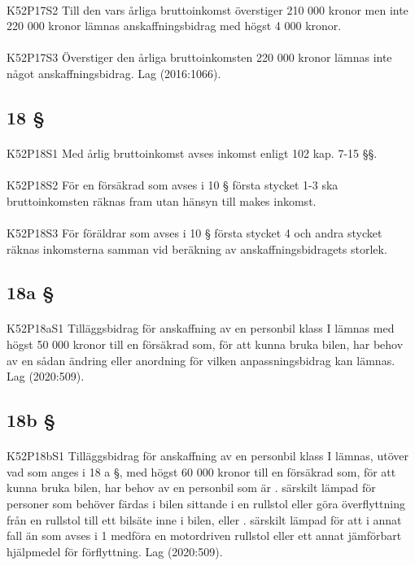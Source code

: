 \documentclass[a4paper,notitlepage,openany,10pt]{book}
\begin{document}
\paragraph*{}
{\tiny K52P17S2}
Till den vars årliga bruttoinkomst överstiger 210 000 kronor men inte 220 000 kronor lämnas anskaffningsbidrag med högst 4 000 kronor.
\paragraph*{}
{\tiny K52P17S3}
Överstiger den årliga bruttoinkomsten 220 000 kronor lämnas inte något anskaffningsbidrag.
Lag (2016:1066).
\subsection*{18 §}
\paragraph*{}
{\tiny K52P18S1}
Med årlig bruttoinkomst avses inkomst enligt 102 kap. 7-15 §§.
\paragraph*{}
{\tiny K52P18S2}
För en försäkrad som avses i 10 § första stycket 1-3 ska bruttoinkomsten räknas fram utan hänsyn till makes inkomst.
\paragraph*{}
{\tiny K52P18S3}
För föräldrar som avses i 10 § första stycket 4 och andra stycket räknas inkomsterna samman vid beräkning av anskaffningsbidragets storlek.
\subsection*{18a §}
\paragraph*{}
{\tiny K52P18aS1}
Tilläggsbidrag för anskaffning av en personbil klass I lämnas med högst 50 000 kronor till en försäkrad som, för att kunna bruka bilen, har behov av en sådan ändring eller anordning för vilken anpassningsbidrag kan lämnas.
Lag (2020:509).
\subsection*{18b §}
\paragraph*{}
{\tiny K52P18bS1}
Tilläggsbidrag för anskaffning av en personbil klass I lämnas, utöver vad som anges i 18 a §, med högst 60 000 kronor till en försäkrad som, för att kunna bruka bilen, har behov av en personbil som är
. särskilt lämpad för personer som behöver färdas i bilen sittande i en rullstol eller göra överflyttning från en rullstol till ett bilsäte inne i bilen, eller
. särskilt lämpad för att i annat fall än som avses i 1 medföra en motordriven rullstol eller ett annat jämförbart hjälpmedel för förflyttning.
Lag (2020:509).
\end{document}
